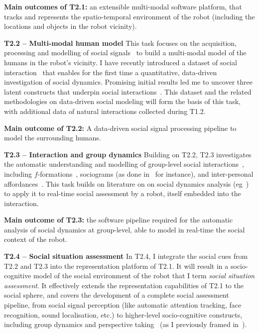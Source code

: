 \begin{framed}
    {\noindent\bf Main outcomes of T2.1:} an extensible multi-modal
    software platform, that tracks and represents the spatio-temporal
    environment of the robot (including the locations and objects in the robot
    vicinity).
\end{framed}

\textbf{T2.2 -- Multi-modal human model}
This task focuses on the acquisition, processing and modelling of social
signals~\cite{gunes2017automatic} to build a multi-modal model of the humans
in the robot's vicinity. I have recently introduced a dataset of social
interaction~\cite{lemaignan2018pinsoro} that enables for the first time a
quantitative, data-driven investigation of social dynamics. Promising initial
results led me to uncover three latent constructs that underpin social
interactions~\cite{bartlett2019what}. This dataset and the related methodologies
on data-driven social modeling will form the basis of this task, with additional
data of natural interactions collected during T1.2.

\begin{framed}
    {\noindent\bf Main outcome of T2.2:} A data-driven social signal processing
    pipeline to model the surrounding humans.
\end{framed}

\textbf{T2.3 -- Interaction and group dynamics} Building on T2.2, T2.3
investigates the automatic understanding and modelling of group-level social
interactions~\cite{tapus2019perceiving}, including
$f$-formations~\cite{marshall2011using}, sociograms (as done
in~\cite{garcia2016hybrid} for instance), and inter-personal
affordances~\cite{pandey2013affordance}. This task builds on literature on on
social dynamics analysis (eg~\cite{durantin2017social,jermann2009physical,
martinez2019collocated}) to apply it to real-time social assessment by a robot,
itself embedded into the interaction.

\begin{framed}
    {\noindent\bf Main outcome of T2.3:} the software pipeline required for the automatic analysis of social
    dynamics at group-level, able to model in real-time the social context
    of the robot.
\end{framed}


\textbf{T2.4 -- Social situation assessment} In T2.4, I integrate the social
cues from T2.2 and T2.3 into the representation platform of T2.1. It will result in
a socio-cognitive model of the social environment of the robot that I term
\emph{social situation assessment}. It effectively extends the representation
capabilities of T2.1 to the social sphere, and covers the development of a
complete social assessment pipeline, from social signal perception (like
automatic attention tracking, face recognition, sound localisation, etc.) to
higher-level socio-cognitive constructs, including group dynamics and
perspective taking~\cite{flavell1992perspectives} (as I previously framed
in~\cite{lemaignan2015mutual, dillenbourg2016symmetry}).

